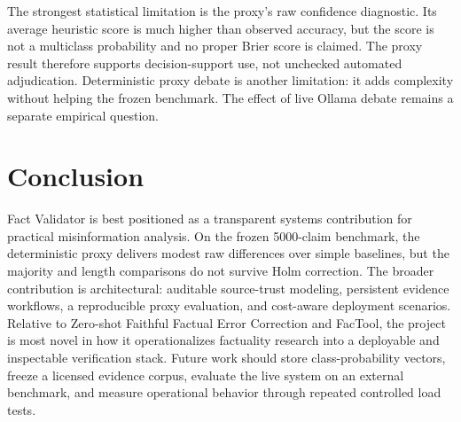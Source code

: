 \documentclass[conference]{IEEEtran}
\begin{document}
The strongest statistical limitation is the proxy's raw confidence diagnostic. Its average heuristic score is much higher than observed accuracy, but the score is not a multiclass probability and no proper Brier score is claimed. The proxy result therefore supports decision-support use, not unchecked automated adjudication. Deterministic proxy debate is another limitation: it adds complexity without helping the frozen benchmark. The effect of live Ollama debate remains a separate empirical question.

\section{Conclusion}

Fact Validator is best positioned as a transparent systems contribution for practical misinformation analysis. On the frozen 5000-claim benchmark, the deterministic proxy delivers modest raw differences over simple baselines, but the majority and length comparisons do not survive Holm correction. The broader contribution is architectural: auditable source-trust modeling, persistent evidence workflows, a reproducible proxy evaluation, and cost-aware deployment scenarios. Relative to Zero-shot Faithful Factual Error Correction and FacTool, the project is most novel in how it operationalizes factuality research into a deployable and inspectable verification stack. Future work should store class-probability vectors, freeze a licensed evidence corpus, evaluate the live system on an external benchmark, and measure operational behavior through repeated controlled load tests.
\end{document}
